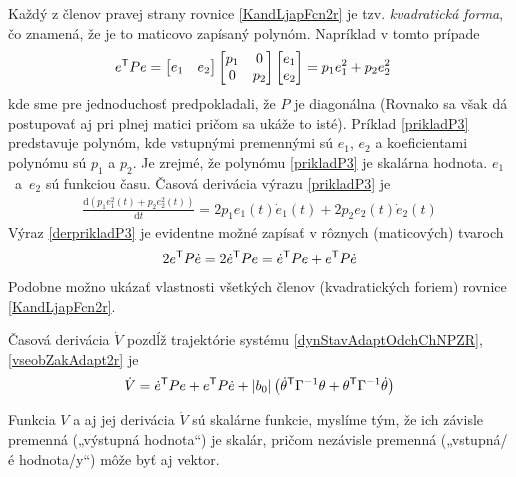 \documentclass[a4paper, 10pt, ]{article}
\begin{document}
Každý z členov pravej strany rovnice \eqref{KandLjapFcn2r} je tzv. \emph{kvadratická forma}, čo znamená, že je to maticovo zapísaný polynóm. Napríklad v tomto prípade
\begin{align} \label{prikladP3}
    e^{\mathsf{T}} P e
    &=
    \begin{bmatrix} e_1 & e_2 \end{bmatrix}
    \begin{bmatrix} p_1 & 0 \\ 0 & p_2 \end{bmatrix}
    \begin{bmatrix} e_1 \\ e_2 \end{bmatrix}
    =
    p_1 e_1^2 + p_2 e_2^2
\end{align}
kde sme pre jednoduchosť predpokladali, že $P$ je diagonálna (Rovnako sa však dá postupovať aj pri plnej matici pričom sa ukáže to isté). Príklad \eqref{prikladP3} predstavuje polynóm, kde vstupnými premennými sú $e_1$, $e_2$ a koeficientami polynómu sú $p_1$ a $p_2$. Je zrejmé, že  polynómu \eqref{prikladP3} je skalárna hodnota. $e_1$~a~$e_2$ sú funkciou času. Časová derivácia výrazu \eqref{prikladP3} je
\begin{align} \label{derprikladP3}
    \frac{\text{d} \left( p_1 e_1^2(t) + p_2 e_2^2(t) \right)}{\text{d}t} = 2 p_1 e_1(t) \dot{e}_1(t) + 2 p_2 e_2(t) \dot{e}_2(t)
\end{align}
Výraz \eqref{derprikladP3} je evidentne možné zapísať v rôznych (maticových) tvaroch
\begin{align} \label{rozneTvaryDerP03}
    2 e^{\mathsf{T}} P \dot{e} = 2 \dot{e}^{\mathsf{T}} P e = \dot{e}^{\mathsf{T}} P e + e^{\mathsf{T}} P \dot{e}
\end{align}
Podobne možno ukázať vlastnosti všetkých členov (kvadratických foriem) rovnice \eqref{KandLjapFcn2r}.


Časová derivácia $\dot{V}$ pozdĺž trajektórie systému \eqref{dynStavAdaptOdchChNPZR}, \eqref{vseobZakAdapt2r} je
\begin{equation} \label{derKandLjapFcn2r}
    \dot{V} = \dot{e}^{\mathsf{T}} P e + e^{\mathsf{T}} P \dot{e} + \left| b_0 \right| \left( \dot \theta^{\mathsf{T}} \Gamma^{-1} \theta + \theta^{\mathsf{T}} \Gamma^{-1} \dot \theta \right)
\end{equation}

Funkcia $V$ a aj jej derivácia $\dot{V}$ sú skalárne funkcie, myslíme tým, že ich závisle premenná („výstupná hodnota“) je skalár, pričom nezávisle premenná („vstupná/é hodnota/y“) môže byť aj vektor.
\end{document}
